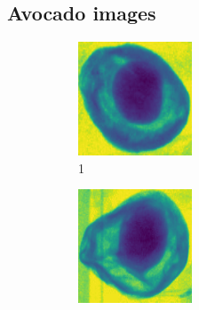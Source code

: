 \documentclass[11pt]{article}
\begin{document}
\subsection{Avocado images}

\begin{figure}[!h]
    \captionsetup[subfigure]{labelformat=empty}
     \centering
     \begin{subfigure}[b]{0.22\textwidth}
         \centering
         \includegraphics[width=\textwidth]{figurer/avocado_dataset/avo_0.jpg}
         \caption{1}
         \label{fig:avo_0}
     \end{subfigure}
     \hfill
     \begin{subfigure}[b]{0.22\textwidth}
         \centering
         \includegraphics[width=\textwidth]{figurer/avocado_dataset/avo_1.jpg}

\end{subfigure}
\end{figure}
\end{document}
